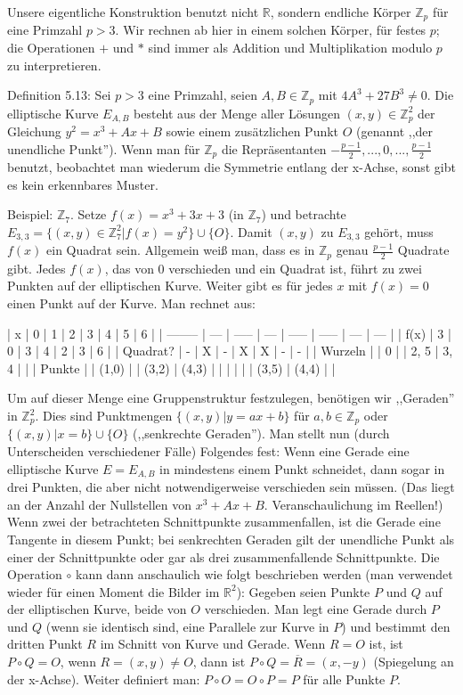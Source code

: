 \documentclass[a4paper]{article}
\begin{document}
\begin{multicols}{3}
    Unsere eigentliche Konstruktion benutzt nicht $\mathbb{R}$, sondern endliche Körper $\mathbb{Z}_p$ für eine Primzahl $p>3$. Wir rechnen ab hier in einem solchen Körper, für festes $p$; die Operationen $+$ und $*$ sind immer als Addition und Multiplikation modulo $p$ zu interpretieren.

    Definition 5.13: Sei $p >3$ eine Primzahl, seien $A,B\in\mathbb{Z}_p$ mit $4A^3+ 27B^3 \not= 0$. Die elliptische Kurve $E_{A,B}$ besteht aus der Menge aller Lösungen $(x,y)\in\mathbb{Z}^2_p$ der Gleichung $y^2=x^3+Ax+B$ sowie einem zusätzlichen Punkt $O$ (genannt ,,der unendliche Punkt'').
    Wenn man für $\mathbb{Z}_p$ die Repräsentanten $-\frac{p-1}{2},..., 0 , ...,\frac{p-1}{2}$ benutzt, beobachtet man wiederum die Symmetrie entlang der x-Achse, sonst gibt es kein erkennbares Muster.

    Beispiel: $\mathbb{Z}_7$. Setze $f(x)=x^3+ 3x+ 3$ (in $\mathbb{Z}_7$) und betrachte $E_{3,3}=\{(x,y)\in\mathbb{Z}^2_7 | f(x)=y^2\}\cup \{O\}$. Damit $(x,y)$ zu $E_{3,3}$ gehört, muss $f(x)$ ein Quadrat sein. Allgemein weiß man, dass es in $\mathbb{Z}_p$ genau $\frac{p-1}{2}$ Quadrate gibt. Jedes $f(x)$, das von $0$ verschieden und ein Quadrat ist, führt zu zwei Punkten auf der elliptischen Kurve. Weiter gibt es für jedes $x$ mit $f(x) = 0$ einen Punkt auf der Kurve. Man rechnet aus:

    | x        | 0   | 1     | 2   | 3     | 4     | 5   | 6   |
    | -------- | --- | ----- | --- | ----- | ----- | --- | --- |
    | f(x)     | 3   | 0     | 3   | 4     | 2     | 3   | 6   |
    | Quadrat? | -   | X     | -   | X     | X     | -   | -   |
    | Wurzeln  |     | 0     |     | 2, 5  | 3, 4  |     |
    | Punkte   |     | (1,0) |     | (3,2) | (4,3) |
    |          |     |       |     | (3,5) | (4,4) |     |

    Um auf dieser Menge eine Gruppenstruktur festzulegen, benötigen wir ,,Geraden'' in $\mathbb{Z}^2_p$. Dies sind Punktmengen $\{(x,y)|y=ax+b\}$ für $a,b\in\mathbb{Z}_p$ oder $\{(x,y)|x=b\}\cup\{O\}$ (,,senkrechte Geraden''). Man stellt nun (durch Unterscheiden verschiedener Fälle) Folgendes fest: Wenn eine Gerade eine elliptische Kurve $E=E_{A,B}$ in mindestens einem Punkt schneidet, dann sogar in drei Punkten, die aber nicht notwendigerweise verschieden sein müssen. (Das liegt an der Anzahl der Nullstellen von $x^3+Ax+B$. Veranschaulichung im Reellen!)
    Wenn zwei der betrachteten Schnittpunkte zusammenfallen, ist die Gerade eine Tangente in diesem Punkt; bei senkrechten Geraden gilt der unendliche Punkt als einer der Schnittpunkte oder gar als drei zusammenfallende Schnittpunkte.
    Die Operation $\circ$ kann dann anschaulich wie folgt beschrieben werden (man verwendet wieder für einen Moment die Bilder im $\mathbb{R}^2$): Gegeben seien Punkte $P$ und $Q$ auf der elliptischen Kurve, beide von $O$ verschieden. Man legt eine Gerade durch $P$ und $Q$ (wenn sie identisch sind, eine Parallele zur Kurve in $P$) und bestimmt den dritten Punkt $R$ im Schnitt von Kurve und Gerade. Wenn $R=O$ ist, ist $P\circ Q=O$, wenn $R= (x,y)\not=O$, dann ist $P\circ Q=\overline{R}= (x,-y)$ (Spiegelung an der x-Achse).
    Weiter definiert man: $P\circ O=O\circ P=P$ für alle Punkte $P$.


\end{multicols}
\end{document}
